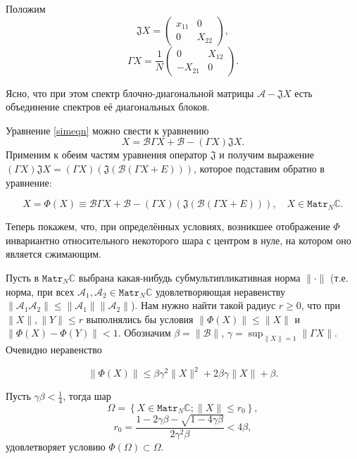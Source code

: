 Положим
\[
    \mathfrak{J} X = \begin{pmatrix} x_{11} & 0 \\ 0 & X_{22} \end{pmatrix}, \]
\[
    \mathfrak{\Gamma} X = \frac{1}{N}\begin{pmatrix} 0 & X_{12} \\ -X_{21} & 0 \end{pmatrix}. \]

Ясно, что при этом спектр блочно-диагональной матрицы \( \mathcal{A} - \mathfrak{J}X \)
есть объединение спектров её диагональных блоков.

Уравнение \eqref{simeqn} можно свести к уравнению
\[ X = \mathcal{B} \Gamma X + \mathcal{B} - (\Gamma X) \mathfrak{J} X. \]
Применим к обеим частям уравнения оператор \( \mathfrak{J} \) и получим выражение
 \( (\Gamma X) \mathfrak{J} X = (\Gamma X)(\mathfrak{J}(\mathcal{B} (\Gamma X + E))) \),
 которое подставим обратно в уравнение:

\begin{equation}\label{fixptneqn}
    X = \Phi(X) \equiv \mathcal{B} \Gamma X + \mathcal{B} - (\Gamma X)(\mathfrak{J}(\mathcal{B} (\Gamma X + E))), \quad X\in\mathtt{Matr}_N\mathbb{C}.
\end{equation}

Теперь покажем, что, при определённых условиях,
возникшее отображение \( \Phi \) инвариантно
относительного некоторого шара с центром в нуле,
на котором оно является сжимающим.

Пусть в \( \mathtt{Matr}_N\mathbb{C} \)
выбрана какая-нибудь субмультипликативная норма \( \|\cdot\| \)
(т.е. норма, при всех \( \mathcal{A}_1, \mathcal{A}_2 \in \mathtt{Matr}_N\mathbb{C} \)
 удовлетворяющая неравенству
 \( \| \mathcal{A}_1\mathcal{A}_2 \| \leq \|\mathcal{A}_1\|\|\mathcal{A}_2\| \)).
Нам нужно найти такой радиус \( r \geq 0 \),
что при \( \|X\|,\|Y\| \leq r \) выполнялись бы условия \( \|\Phi(X)\| \leq \|X\| \)
и \( \|\Phi(X) - \Phi(Y)\| < 1 \).
Обозначим
\( \beta = \|\mathcal{B}\| \), \( \gamma = \sup_{\|X\|=1} \|\Gamma X\| \).
Очевидно неравенство


\[ \| \Phi(X) \| \leq
     \beta \gamma^2 \|X\|^2 + 2\beta\gamma\|X\| + \beta. \]

\begin{lemma}
    Пусть \( \gamma\beta < \frac14\),
    тогда шар
    \[
        \Omega = \left\{ X\in \mathtt{Matr}_N\mathbb{C}; \|X\| \leq r_0 \right\}, \]
    \[  r_0 = \frac{1 - 2\gamma\beta - \sqrt{1-4\gamma\beta}}{2\gamma^2\beta} < 4\beta, \]
    удовлетворяет условию \( \Phi(\Omega)\subset\Omega \).
\end{lemma}

